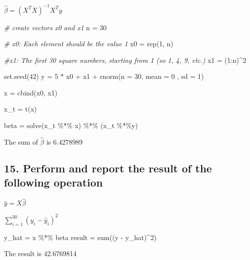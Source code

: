 \documentclass[
]{article}
\newenvironment{Shaded}{\begin{snugshade}}{\end{snugshade}}
\newcommand{\AttributeTok}[1]{\textcolor[rgb]{0.77,0.63,0.00}{#1}}
\newcommand{\CommentTok}[1]{\textcolor[rgb]{0.56,0.35,0.01}{\textit{#1}}}
\newcommand{\DecValTok}[1]{\textcolor[rgb]{0.00,0.00,0.81}{#1}}
\newcommand{\FunctionTok}[1]{\textcolor[rgb]{0.00,0.00,0.00}{#1}}
\newcommand{\NormalTok}[1]{#1}
\newcommand{\OtherTok}[1]{\textcolor[rgb]{0.56,0.35,0.01}{#1}}
\newcommand{\SpecialCharTok}[1]{\textcolor[rgb]{0.00,0.00,0.00}{#1}}
\begin{document}
\(\hat\beta = (X^TX)^{-1}X^Ty\)

\begin{Shaded}
\begin{Highlighting}[]
\CommentTok{\# create vectors x0 and x1}
\NormalTok{n }\OtherTok{=} \DecValTok{30}

\CommentTok{\# x0: Each element should be the value 1 }
\NormalTok{x0 }\OtherTok{=} \FunctionTok{rep}\NormalTok{(}\DecValTok{1}\NormalTok{, n)}

\CommentTok{\#x1: The first 30 square numbers, starting from 1 (so 1, 4, 9, etc.) }
\NormalTok{x1 }\OtherTok{=}\NormalTok{ (}\DecValTok{1}\SpecialCharTok{:}\NormalTok{n)}\SpecialCharTok{\^{}}\DecValTok{2}

\FunctionTok{set.seed}\NormalTok{(}\DecValTok{42}\NormalTok{)}
\NormalTok{y  }\OtherTok{=} \DecValTok{5} \SpecialCharTok{*}\NormalTok{ x0 }\SpecialCharTok{+}\NormalTok{ x1 }\SpecialCharTok{+} \FunctionTok{rnorm}\NormalTok{(}\AttributeTok{n =} \DecValTok{30}\NormalTok{, }\AttributeTok{mean =} \DecValTok{0}\NormalTok{ , }\AttributeTok{sd =} \DecValTok{1}\NormalTok{)}

\NormalTok{x }\OtherTok{=} \FunctionTok{cbind}\NormalTok{(x0, x1)}

\NormalTok{x\_t }\OtherTok{=} \FunctionTok{t}\NormalTok{(x)}

\NormalTok{beta }\OtherTok{=} \FunctionTok{solve}\NormalTok{(x\_t }\SpecialCharTok{\%*\%}\NormalTok{ x) }\SpecialCharTok{\%*\%}\NormalTok{ (x\_t }\SpecialCharTok{\%*\%}\NormalTok{y)}
\end{Highlighting}
\end{Shaded}

The sum of \(\hat\beta\) is 6.4278989

\hypertarget{perform-and-report-the-result-of-the-following-operation}{%
\subsection{15. Perform and report the result of the following
operation}\label{perform-and-report-the-result-of-the-following-operation}}

\(\hat y = X\hat\beta\)

\(\sum_{i=1}^{30}(y_i - \hat y_i)^2\)

\begin{Shaded}
\begin{Highlighting}[]
\NormalTok{y\_hat }\OtherTok{=}\NormalTok{ x }\SpecialCharTok{\%*\%}\NormalTok{ beta}
\NormalTok{result }\OtherTok{=} \FunctionTok{sum}\NormalTok{((y }\SpecialCharTok{{-}}\NormalTok{ y\_hat)}\SpecialCharTok{\^{}}\DecValTok{2}\NormalTok{)}
\end{Highlighting}
\end{Shaded}

The result is 42.6769814
\end{document}

